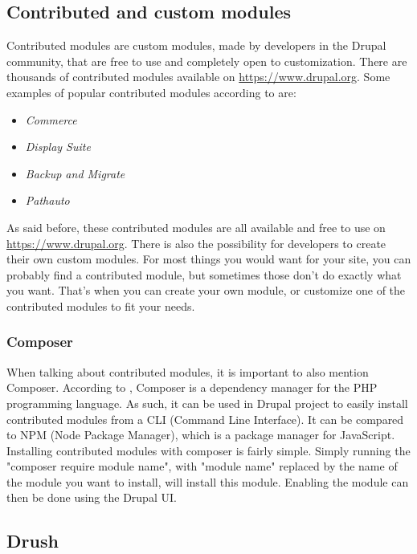 
\subsection{Contributed and custom modules}

Contributed modules are custom modules, made by developers in the Drupal community, that are free to use and completely open to customization. There are thousands of contributed modules available on \url{https://www.drupal.org}. Some examples of popular contributed modules according to \textcite{Tomlinson2015} are: 

\begin{itemize}
	\item  \emph{Commerce}
	\item  \emph{Display Suite}
	\item  \emph{Backup and Migrate}
	\item  \emph{Pathauto}
\end{itemize}

As said before, these contributed modules are all available and free to use on \url{https://www.drupal.org}. There is also the possibility for developers to create their own custom modules. For most things you would want for your site, you can probably find a contributed module, but sometimes those don't do exactly what you want. That's when you can create your own module, or customize one of the contributed modules to fit your needs.

\subsubsection{Composer}
\label{sss:composer}

When talking about contributed modules, it is important to also mention \gls{Composer}. According to \textcite{M.Kromann2018}, Composer is a dependency manager for the PHP programming language. As such, it can be used in Drupal project to easily install contributed modules from a \gls{CLI} (Command Line Interface). It can be compared to \gls{NPM} (Node Package Manager), which is a package manager for JavaScript. Installing contributed modules with composer is fairly simple. Simply running the "composer require {module name}", with "{module name}" replaced by the name of the module you want to install, will install this module. Enabling the module can then be done using the Drupal UI.

\subsection{Drush}

